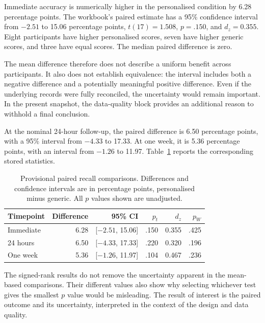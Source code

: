 Immediate accuracy is numerically higher in the personalised condition by 6.28 percentage points. The workbook's paired estimate has a 95\% confidence interval from $-2.51$ to 15.06 percentage points, $t(17)=1.508$, $p=.150$, and $d_z=0.355$. Eight participants have higher personalised scores, seven have higher generic scores, and three have equal scores. The median paired difference is zero.

The mean difference therefore does not describe a uniform benefit across participants. It also does not establish equivalence: the interval includes both a negative difference and a potentially meaningful positive difference. Even if the underlying records were fully reconciled, the uncertainty would remain important. In the present snapshot, the data-quality block provides an additional reason to withhold a final conclusion.

At the nominal 24-hour follow-up, the paired difference is 6.50 percentage points, with a 95\% interval from $-4.33$ to 17.33. At one week, it is 5.36 percentage points, with an interval from $-1.26$ to 11.97. Table~\ref{tab:recalltests} reports the corresponding stored statistics.

\begin{table}[htbp]
\centering
\small
\caption{Provisional paired recall comparisons. Differences and confidence intervals are in percentage points, personalised minus generic. All $p$ values shown are unadjusted.}
\label{tab:recalltests}
\begin{tabular}{lrrrrr}
\toprule
Timepoint & Difference & 95\% CI & $p_t$ & $d_z$ & $p_W$ \\
\midrule
Immediate & 6.28 & [$-2.51$, 15.06] & .150 & 0.355 & .425 \\
24 hours & 6.50 & [$-4.33$, 17.33] & .220 & 0.320 & .196 \\
One week & 5.36 & [$-1.26$, 11.97] & .104 & 0.467 & .236 \\
\bottomrule
\end{tabular}
\end{table}

The signed-rank results do not remove the uncertainty apparent in the mean-based comparisons. Their different values also show why selecting whichever test gives the smallest $p$ value would be misleading. The result of interest is the paired outcome and its uncertainty, interpreted in the context of the design and data quality.

